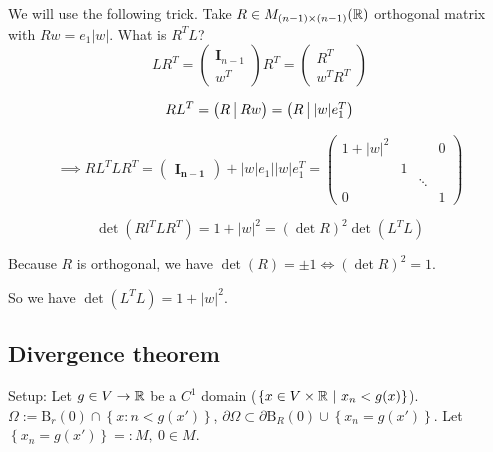 \documentclass[12pt]{article}
\begin{document}
\begin{proofbox}
    We will use the following trick. Take $R \in M_{(n-1) \times (n-1)}(\mathbb{R})$ orthogonal matrix with $R w = e_1 |w|$. What is $R^TL$?
    $$
        LR^T 
        =   \begin{pmatrix}
                \mathbf{I}_{n-1} \\
                \hline
                w^T 
            \end{pmatrix} R^T
        =   \begin{pmatrix}
                R^T \\
                \hline
                w^TR^T
            \end{pmatrix}
    $$

    $$
        RL^T 
        =   \begin{pmatrix}
                R\ \vline\ Rw
            \end{pmatrix}
        =   \begin{pmatrix}
                R\ \vline\ |w| e_1^T
            \end{pmatrix}
    $$

    $$
        \implies RL^TLR^T = \begin{pmatrix} \mathbf{I_{n-1}}\end{pmatrix}+ |w|e_1||w|e_1^T 
        =   \begin{pmatrix}
                1 + |w|^2 &  & & 0 \\
                 & 1 & &   \\
                & & \ddots &  \\
                0 & &  & 1
            \end{pmatrix}
    $$

    $$
        \det(Rl^TLR^T) = 1 + |w|^2 = (\det R)^2 \det(L^TL)
    $$

    Because $R$ is orthogonal, we have $\det(R) = \pm 1 \iff (\det R)^2 = 1$.
    
    So we have $\det(L^T L) = 1 + |w|^2$.
\end{proofbox}

\subsection{Divergence theorem}

Setup: Let $g \in V \rightarrow \mathbb{R}$ be a $C^1$ domain ($\left\{x \in V \times \mathbb{R} \ |\ x_n < g(x) \right\}$). $\Omega := \mathrm{B}_r(0) \cap \left\{x:n < g(x')\right\}$, $\partial \Omega \subset \partial \mathrm{B}_R(0) \cup \left\{x_n = g(x')\right\}$. Let $\left\{x_n = g(x')\right\} =: M,\ 0 \in M$.
\end{document}
